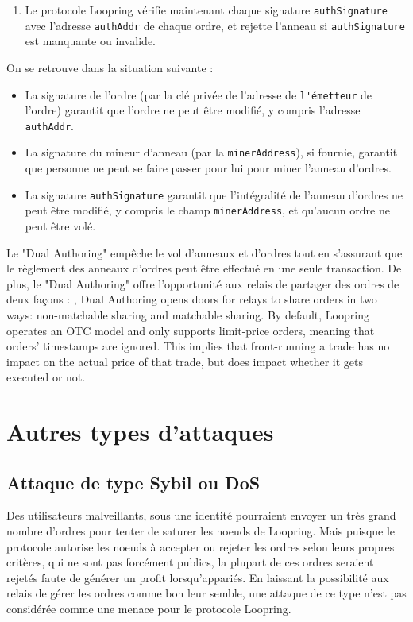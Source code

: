 \documentclass[UTF8,nofonts]{article}
\begin{document}
\begin{multicols}{2}
\begin{enumerate}
	\item Le protocole Loopring vérifie maintenant chaque signature \verb|authSignature| avec l'adresse \verb|authAddr| de chaque ordre, et rejette l'anneau si \verb|authSignature| est manquante ou invalide.
 
\end{enumerate}

On se retrouve dans la situation suivante :

\begin{itemize}

	\item  La signature de l'ordre (par la clé privée de l'adresse de \verb|l'émetteur| de l'ordre) garantit que l'ordre ne peut être modifié, y compris l'adresse \verb|authAddr|.
	\item  La signature du mineur d'anneau (par la \verb|minerAddress|), si fournie, garantit que personne ne peut se faire passer pour lui pour miner l'anneau d'ordres.
	\item  La signature \verb|authSignature| garantit que l'intégralité de l'anneau d'ordres ne peut être modifié, y compris le champ \verb|minerAddress|, et qu'aucun ordre ne peut être volé.

\end{itemize}

Le "Dual Authoring" empêche le vol d'anneaux et d'ordres tout en s'assurant que le règlement des anneaux d'ordres peut être effectué en une seule transaction. De plus, le "Dual Authoring" offre l'opportunité aux relais de partager des ordres de deux façons : , Dual Authoring opens doors for relays to share orders in two ways: non-matchable sharing and matchable sharing. By default, Loopring operates an OTC model and only supports limit-price orders, meaning that orders' timestamps are ignored. This implies that front-running a trade has no impact on the actual price of that trade, but does impact whether it gets executed or not.

\section{Autres types d'attaques}

\subsection{Attaque de type Sybil ou DoS}
Des utilisateurs malveillants, sous une identité  pourraient envoyer un très grand nombre d'ordres pour tenter de saturer les noeuds de Loopring. Mais puisque le protocole autorise les noeuds à accepter ou rejeter les ordres selon leurs propres critères, qui ne sont pas forcément publics, la plupart de ces ordres seraient rejetés faute de générer un profit lorsqu'appariés. En laissant la possibilité aux relais de gérer les ordres comme bon leur semble, une attaque de ce type n'est pas considérée comme une menace pour le protocole Loopring.


\end{multicols}
\end{document}
